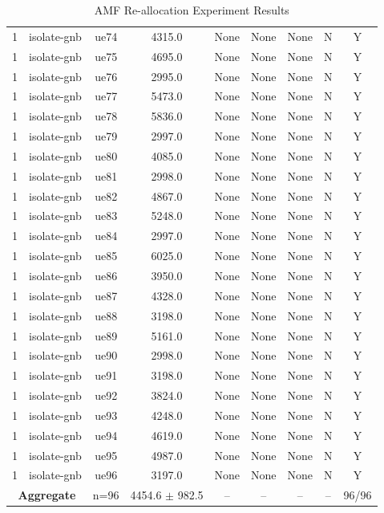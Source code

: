 \begin{table}[ht]
\begin{tabular}{|c|c|c|c|c|c|c|c|c|}
1 & isolate-gnb & ue74 & 4315.0 & None & None & None & N & Y \\
1 & isolate-gnb & ue75 & 4695.0 & None & None & None & N & Y \\
1 & isolate-gnb & ue76 & 2995.0 & None & None & None & N & Y \\
1 & isolate-gnb & ue77 & 5473.0 & None & None & None & N & Y \\
1 & isolate-gnb & ue78 & 5836.0 & None & None & None & N & Y \\
1 & isolate-gnb & ue79 & 2997.0 & None & None & None & N & Y \\
1 & isolate-gnb & ue80 & 4085.0 & None & None & None & N & Y \\
1 & isolate-gnb & ue81 & 2998.0 & None & None & None & N & Y \\
1 & isolate-gnb & ue82 & 4867.0 & None & None & None & N & Y \\
1 & isolate-gnb & ue83 & 5248.0 & None & None & None & N & Y \\
1 & isolate-gnb & ue84 & 2997.0 & None & None & None & N & Y \\
1 & isolate-gnb & ue85 & 6025.0 & None & None & None & N & Y \\
1 & isolate-gnb & ue86 & 3950.0 & None & None & None & N & Y \\
1 & isolate-gnb & ue87 & 4328.0 & None & None & None & N & Y \\
1 & isolate-gnb & ue88 & 3198.0 & None & None & None & N & Y \\
1 & isolate-gnb & ue89 & 5161.0 & None & None & None & N & Y \\
1 & isolate-gnb & ue90 & 2998.0 & None & None & None & N & Y \\
1 & isolate-gnb & ue91 & 3198.0 & None & None & None & N & Y \\
1 & isolate-gnb & ue92 & 3824.0 & None & None & None & N & Y \\
1 & isolate-gnb & ue93 & 4248.0 & None & None & None & N & Y \\
1 & isolate-gnb & ue94 & 4619.0 & None & None & None & N & Y \\
1 & isolate-gnb & ue95 & 4987.0 & None & None & None & N & Y \\
1 & isolate-gnb & ue96 & 3197.0 & None & None & None & N & Y \\
\multicolumn{2}{|c|}{\textbf{Aggregate}} & n=96 & 4454.6 $\pm$ 982.5 & -- & -- & -- & -- & 96/96 \\
\hline
\end{tabular}
\caption{AMF Re-allocation Experiment Results}
\label{tab:amf_realloc}
\end{table}
